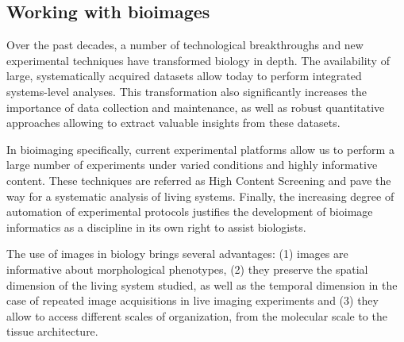 \subsection{Working with bioimages}
\label{subsec:intro_bioimages}

Over the past decades, a number of technological breakthroughs and new experimental techniques have transformed biology in depth. The availability of large, systematically acquired datasets allow today to perform integrated systems-level analyses. 
This transformation also significantly increases the importance of data collection and maintenance, as well as robust quantitative approaches allowing to extract valuable insights from these datasets.

In bioimaging specifically, current experimental platforms allow us to perform a large number of experiments under varied conditions and highly informative content.
These techniques are referred as High Content Screening and pave the way for a systematic analysis of living systems.
Finally, the increasing degree of automation of experimental protocols justifies the development of bioimage informatics as a discipline in its own right to assist biologists.

The use of images in biology brings several advantages: (1) images are informative about morphological phenotypes, (2)
they preserve the spatial dimension of the living system studied, as well as the temporal dimension in the case of repeated image acquisitions in live imaging experiments and (3) they allow to access different scales of organization, from the molecular scale to the tissue architecture.  

